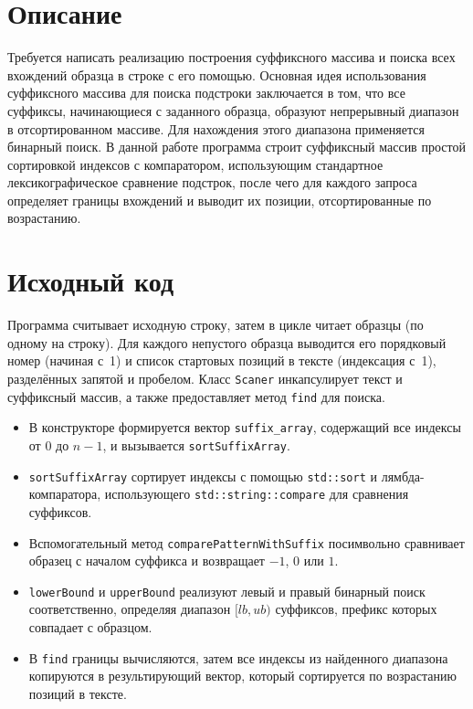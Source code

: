\section{Описание}
Требуется написать реализацию построения суффиксного массива и поиска всех вхождений образца в строке с его помощью.  
Основная идея использования суффиксного массива для поиска подстроки заключается в том, что все суффиксы, начинающиеся с заданного образца, образуют непрерывный диапазон в отсортированном массиве. Для нахождения этого диапазона применяется бинарный поиск.  
В данной работе программа строит суффиксный массив простой сортировкой индексов с компаратором, использующим стандартное лексикографическое сравнение подстрок, после чего для каждого запроса определяет границы вхождений и выводит их позиции, отсортированные по возрастанию.

\pagebreak

\section{Исходный код}
Программа считывает исходную строку, затем в цикле читает образцы (по одному на строку). Для каждого непустого образца выводится его порядковый номер (начиная с~1) и список стартовых позиций в тексте (индексация с~1), разделённых запятой и пробелом.  
Класс \texttt{Scaner} инкапсулирует текст и суффиксный массив, а также предоставляет метод \texttt{find} для поиска.  
\begin{itemize}
\item В конструкторе формируется вектор \texttt{suffix\_array}, содержащий все индексы от $0$ до $n-1$, и вызывается \texttt{sortSuffixArray}.
\item \texttt{sortSuffixArray} сортирует индексы с помощью \texttt{std::sort} и лямбда-компаратора, использующего \texttt{std::string::compare} для сравнения суффиксов.
\item Вспомогательный метод \texttt{comparePatternWithSuffix} посимвольно сравнивает образец с началом суффикса и возвращает $-1$, $0$ или $1$.
\item \texttt{lowerBound} и \texttt{upperBound} реализуют левый и правый бинарный поиск соответственно, определяя диапазон $[lb, ub)$ суффиксов, префикс которых совпадает с образцом.
\item В \texttt{find} границы вычисляются, затем все индексы из найденного диапазона копируются в результирующий вектор, который сортируется по возрастанию позиций в тексте.
\end{itemize}

